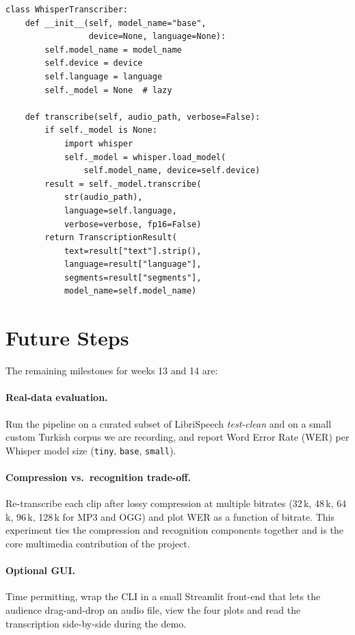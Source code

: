 \documentclass[conference]{IEEEtran}
\begin{document}
\begin{lstlisting}[caption={Core of \texttt{transcriber.py} -- lazy
  model loading and a typed result.},label={lst:transcriber}]
class WhisperTranscriber:
    def __init__(self, model_name="base",
                 device=None, language=None):
        self.model_name = model_name
        self.device = device
        self.language = language
        self._model = None  # lazy

    def transcribe(self, audio_path, verbose=False):
        if self._model is None:
            import whisper
            self._model = whisper.load_model(
                self.model_name, device=self.device)
        result = self._model.transcribe(
            str(audio_path),
            language=self.language,
            verbose=verbose, fp16=False)
        return TranscriptionResult(
            text=result["text"].strip(),
            language=result["language"],
            segments=result["segments"],
            model_name=self.model_name)
\end{lstlisting}

\section{Future Steps}\label{sec:future}
The remaining milestones for weeks 13 and 14 are:

\paragraph{Real-data evaluation.}
Run the pipeline on a curated subset of LibriSpeech \emph{test-clean} and
on a small custom Turkish corpus we are recording, and report Word Error
Rate (WER) per Whisper model size (\texttt{tiny}, \texttt{base},
\texttt{small}).

\paragraph{Compression vs.\ recognition trade-off.}
Re-transcribe each clip after lossy compression at multiple bitrates
(32\,k, 48\,k, 64\,k, 96\,k, 128\,k for MP3 and OGG) and plot WER as a
function of bitrate.  This experiment ties the compression and
recognition components together and is the core multimedia
contribution of the project.

\paragraph{Optional GUI.}
Time permitting, wrap the CLI in a small Streamlit front-end that lets
the audience drag-and-drop an audio file, view the four plots and read
the transcription side-by-side during the demo.
\end{document}
